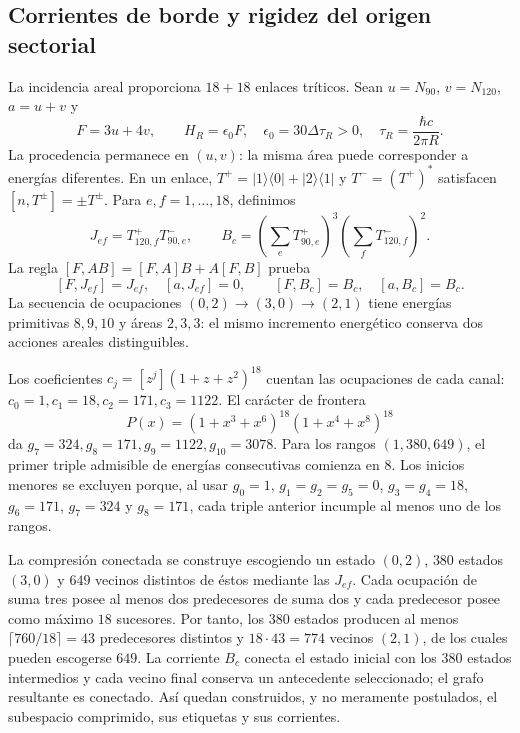 \subsection{Corrientes de borde y rigidez del origen sectorial}

La incidencia areal proporciona $18+18$ enlaces tríticos. Sean
$u=N_{90}$, $v=N_{120}$, $a=u+v$ y
\[
 F=3u+4v,\qquad H_R=\epsilon_0F,
 \quad \epsilon_0=30\Delta\tau_R>0,
 \quad \tau_R=\frac{\hbar c}{2\pi R}.
\]
La procedencia permanece en $(u,v)$: la misma área puede corresponder a
energías diferentes. En un enlace,
$T^+=|1\rangle\langle0|+|2\rangle\langle1|$ y $T^-=(T^+)^*$ satisfacen
$[n,T^\pm]=\pm T^\pm$. Para $e,f=1,\ldots,18$, definimos
\[
 J_{ef}=T^+_{120,f}T^-_{90,e},\qquad
 B_c=\left(\sum_eT^+_{90,e}\right)^3
     \left(\sum_fT^-_{120,f}\right)^2.
\]
La regla $[F,AB]=[F,A]B+A[F,B]$ prueba
\[
 [F,J_{ef}]=J_{ef},\quad[a,J_{ef}]=0,
 \qquad [F,B_c]=B_c,\quad[a,B_c]=B_c.
\]
La secuencia de ocupaciones
$(0,2)\to(3,0)\to(2,1)$ tiene energías primitivas $8,9,10$ y áreas
$2,3,3$: el mismo incremento energético conserva dos acciones areales
distinguibles.

Los coeficientes $c_j=[z^j](1+z+z^2)^{18}$ cuentan las ocupaciones de
cada canal: $c_0=1,c_1=18,c_2=171,c_3=1122$. El carácter de frontera
\[
 P(x)=(1+x^3+x^6)^{18}(1+x^4+x^8)^{18}
\]
da $g_7=324,g_8=171,g_9=1122,g_{10}=3078$. Para los rangos
$(1,380,649)$, el primer triple admisible de energías consecutivas comienza
en $8$. Los inicios menores se excluyen porque, al usar
$g_0=1$, $g_1=g_2=g_5=0$, $g_3=g_4=18$, $g_6=171$, $g_7=324$ y
$g_8=171$, cada triple anterior incumple al menos uno de los rangos.

La compresión conectada se construye escogiendo un estado $(0,2)$,
$380$ estados $(3,0)$ y $649$ vecinos distintos de éstos mediante las
$J_{ef}$. Cada ocupación de suma tres posee al menos dos predecesores de
suma dos y cada predecesor posee como máximo $18$ sucesores. Por tanto,
los $380$ estados producen al menos
$\lceil760/18\rceil=43$ predecesores distintos y
$18\cdot43=774$ vecinos $(2,1)$, de los cuales pueden escogerse $649$.
La corriente $B_c$ conecta el estado inicial con los $380$ estados
intermedios y cada vecino final conserva un antecedente seleccionado; el
grafo resultante es conectado. Así quedan construidos, y no meramente
postulados, el subespacio comprimido, sus etiquetas y sus corrientes.

